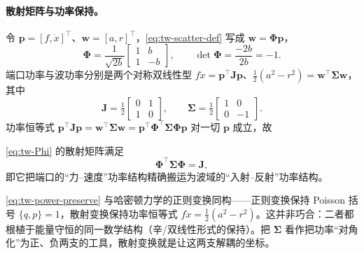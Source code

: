 \paragraph{散射矩阵与功率保持。}
令 $\mathbf p=[f,\dot x]^\top$、$\mathbf w=[a,r]^\top$，\cref{eq:tw-scatter-def} 写成 $\mathbf w=\boldsymbol\Phi\mathbf p$，
\begin{equation}
  \boldsymbol\Phi=\frac{1}{\sqrt{2b}}\begin{bmatrix}1&b\\[1pt]1&-b\end{bmatrix},\qquad
  \det\boldsymbol\Phi=\frac{-2b}{2b}=-1.
  \label{eq:tw-Phi}
\end{equation}
端口功率与波功率分别是两个对称双线性型 $f\dot x=\mathbf p^\top\mathbf J\mathbf p$、$\tfrac12(a^2-r^2)=\mathbf w^\top\boldsymbol\Sigma\mathbf w$，其中
\begin{equation}
  \mathbf J=\tfrac12\begin{bmatrix}0&1\\1&0\end{bmatrix},\qquad
  \boldsymbol\Sigma=\tfrac12\begin{bmatrix}1&0\\0&-1\end{bmatrix}.
  \label{eq:tw-JSigma}
\end{equation}
功率恒等式 $\mathbf p^\top\mathbf J\mathbf p=\mathbf w^\top\boldsymbol\Sigma\mathbf w=\mathbf p^\top\boldsymbol\Phi^\top\boldsymbol\Sigma\boldsymbol\Phi\mathbf p$ 对一切 $\mathbf p$ 成立，故

\begin{proposition}[散射变换是功率保持变换]\label{prop:tw-power-preserving}
\cref{eq:tw-Phi} 的散射矩阵满足
\begin{equation}
  \boldsymbol\Phi^\top\boldsymbol\Sigma\boldsymbol\Phi=\mathbf J,
  \label{eq:tw-power-preserve}
\end{equation}
即它把端口的“力--速度”功率结构精确搬运为波域的“入射--反射”功率结构。
\end{proposition}

\begin{insight}
\cref{eq:tw-power-preserve} 与哈密顿力学的正则变换同构——正则变换保持 Poisson 括号 $\{q,p\}=1$，散射变换保持功率恒等式 $f\dot x=\tfrac12(a^2-r^2)$。这并非巧合：二者都根植于能量守恒的同一数学结构（辛/双线性形式的保持）。把 $\boldsymbol\Sigma$ 看作把功率“对角化”为正、负两支的工具，散射变换就是让这两支解耦的坐标。
\end{insight}

